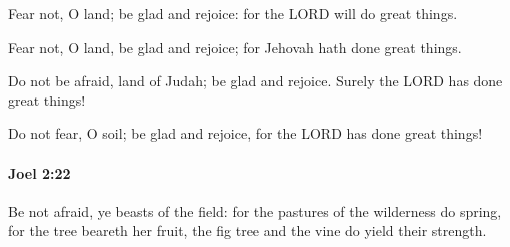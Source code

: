 			Fear not, O land; be glad and rejoice: for the LORD will do great things.

			\begin{versebox}
					\item[BHS] 
					\item[LXX] 
					\item[ASV] Fear not, O land, be glad and rejoice; for Jehovah hath done great things.
					\item[NIV] Do not be afraid, land of Judah; be glad and rejoice. Surely the LORD has done great things!
					\item[NRSV] Do not fear, O soil; be glad and rejoice, for the LORD has done great things!
			\end{versebox}

		\paragraph{Joel 2:22} %
			\label{JOEL-2-22}

			Be not afraid, ye beasts of the field: for the pastures of the wilderness do spring, for the tree beareth her fruit, the fig tree and the vine do yield their strength.

